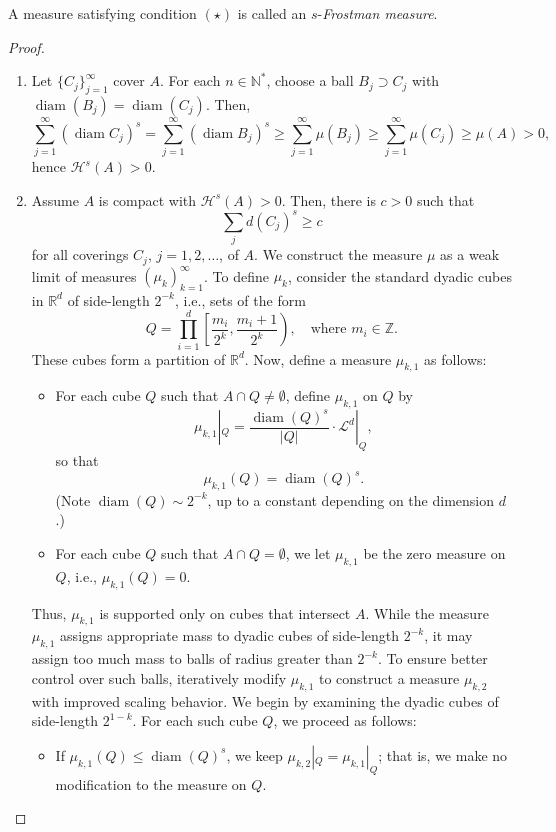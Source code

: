 \documentclass[12pt,a4paper]{report}
\theoremstyle{definition}
\begin{document}
A measure satisfying condition $(\star)$ is called an $s$-\textit{Frostman measure}.
\begin{proof}~
\begin{enumerate}
\item[($\Leftarrow$)] Let $\{C_j\}_{j=1}^{\infty}$ cover $A$. For each $n \in \mathbb{N}^*$, choose a ball $B_j \supset C_j$ with \( \operatorname{diam}(B_j) = \operatorname{diam}(C_j) \). Then,
$$
\sum_{j=1}^{\infty} (\operatorname{diam}C_j)^s = \sum_{j=1}^{\infty}  (\operatorname{diam}B_j)^s \ge \sum_{j=1}^{\infty} \mu(B_j) \ge \sum_{j=1}^{\infty} \mu(C_j) \ge \mu(A) > 0,
$$
hence \( \mathcal{H}^s(A) > 0 \).
\item[($\Rightarrow$)] Assume \( A \) is compact with \(\mathcal{H}^s(A) > 0 \). Then, there is \( c > 0 \) such that
\begin{equation}
\sum_j d(C_j)^s \geq c
\label{eq:lower-bound}
\end{equation}
for all coverings \( C_j,\, j = 1, 2, \dots \), of \( A \). We construct the measure \( \mu \) as a weak limit of measures \( (\mu_k)_{k=1}^\infty \). To define \( \mu_k \), consider the standard dyadic cubes in \( \mathbb{R}^d \) of side-length \( 2^{-k} \), i.e., sets of the form
\[
Q = \prod_{i=1}^d \left[ \frac{m_i}{2^k}, \frac{m_i + 1}{2^k} \right), \quad \text{where } m_i \in \mathbb{Z}.
\]
These cubes form a partition of \( \mathbb{R}^d \). Now, define a measure \( \mu_{k,1} \) as follows:
\begin{itemize}
    \item For each cube \( Q \) such that \( A \cap Q \neq \emptyset \), define \( \mu_{k,1} \) on \( Q \) by
    \[
    \mu_{k,1}|_Q = \frac{\operatorname{diam}(Q)^s}{|Q|} \cdot \mathcal{L}^d|_Q,
    \]
    so that
    \[
    \mu_{k,1}(Q) = \operatorname{diam}(Q)^s.
    \]
    (Note \(\operatorname{diam}(Q) \sim 2^{-k} \), up to a constant depending on the dimension \( d \).)

    \item For each cube \( Q \) such that \( A \cap Q = \emptyset \), we let \( \mu_{k,1} \) be the zero measure on \( Q \), i.e., \( \mu_{k,1}(Q) = 0 \).
\end{itemize}

Thus, \( \mu_{k,1} \) is supported only on cubes that intersect \( A \).
While the measure \( \mu_{k,1} \) assigns appropriate mass to dyadic cubes of side-length \( 2^{-k} \), it may assign too much mass to balls of radius greater than \( 2^{-k} \). To ensure better control over such balls, iteratively modify \( \mu_{k,1} \) to construct a measure \( \mu_{k,2} \) with improved scaling behavior.
We begin by examining the dyadic cubes of side-length \( 2^{1 - k} \). For each such cube \( Q \), we proceed as follows:
\begin{itemize}
    \item If \( \mu_{k,1}(Q) \leq \operatorname{diam}(Q)^s \), we keep \( \mu_{k,2}|_Q = \mu_{k,1}|_Q \); that is, we make no modification to the measure on \( Q \).


\end{itemize}
\end{enumerate}
\end{proof}
\end{document}
